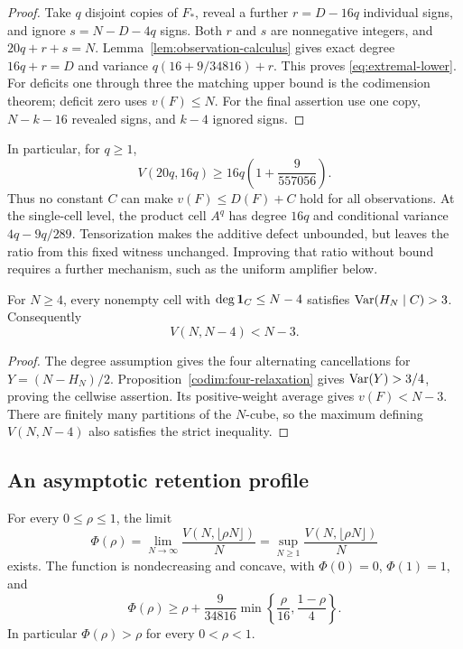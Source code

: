 \begin{proof}
Take \(q\) disjoint copies of \(F_*\), reveal a further
\(r=D-16q\) individual signs, and ignore
\(s=N-D-4q\) signs. Both \(r\) and \(s\) are nonnegative integers,
and \(20q+r+s=N\). Lemma~\ref{lem:observation-calculus} gives exact
degree \(16q+r=D\) and variance
\(q(16+9/34816)+r\).
This proves \eqref{eq:extremal-lower}.
For deficits one through three the matching upper bound is the
codimension theorem; deficit zero uses \(v(F)\le N\).
For the final assertion use one copy, \(N-k-16\) revealed signs,
and \(k-4\) ignored signs.
\end{proof}

In particular, for \(q\ge1\),
\[
 V(20q,16q)\ge16q\left(1+\frac9{557056}\right).
\]
Thus no constant \(C\) can make \(v(F)\le D(F)+C\) hold for all
observations. At the single-cell level, the product cell \(A^q\) has
degree \(16q\) and conditional variance
\(4q-9q/289\). Tensorization makes the additive defect unbounded,
but leaves the ratio from this fixed witness unchanged. Improving
that ratio without bound requires a further mechanism, such as the
uniform amplifier below.

\begin{corollary}
\label{cor:strict-four}
For \(N\ge4\), every nonempty cell with
\(\deg\mathbf 1_C\le N-4\) satisfies \(\operatorname{Var}(H_N\mid C)>3\).
Consequently
\[
 V(N,N-4)<N-3.
\]
\end{corollary}

\begin{proof}
The degree assumption gives the four alternating cancellations for
\(Y=(N-H_N)/2\). Proposition~\ref{codim:four-relaxation}
gives \(\operatorname{Var}(Y)>3/4\), proving the cellwise assertion.
Its positive-weight average gives \(v(F)<N-3\).
There are finitely many partitions of the \(N\)-cube, so the
maximum defining \(V(N,N-4)\) also satisfies the strict inequality.
\end{proof}

\subsection{An asymptotic retention profile}

\begin{proposition}
\label{prop:profile}
For every \(0\le\rho\le1\), the limit
\[
 \Phi(\rho)=\lim_{N\to\infty}
        \frac{V(N,\lfloor\rho N\rfloor)}N
 =\sup_{N\ge1}\frac{V(N,\lfloor\rho N\rfloor)}N
\]
exists. The function is nondecreasing and concave, with
\(\Phi(0)=0\), \(\Phi(1)=1\), and
\begin{equation}\label{eq:profile-lower}
 \Phi(\rho)\ge\rho+\frac9{34816}
       \min\left\{\frac{\rho}{16},\frac{1-\rho}{4}\right\}.
\end{equation}
In particular \(\Phi(\rho)>\rho\) for every \(0<\rho<1\).
\end{proposition}

